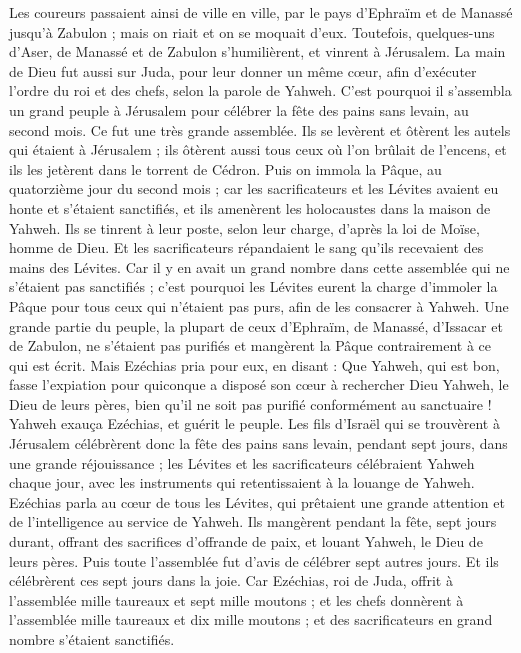 \begin{multicols}{2}
Les coureurs passaient ainsi de ville en ville, par le pays d'Ephraïm et de Manassé jusqu'à Zabulon ; mais on riait et on se moquait d’eux.
Toutefois, quelques-uns d'Aser, de Manassé et de Zabulon s'humilièrent, et vinrent à Jérusalem.
La main de Dieu fut aussi sur Juda, pour leur donner un même cœur, afin d'exécuter l’ordre du roi et des chefs, selon la parole de Yahweh.
C'est pourquoi il s'assembla un grand peuple à Jérusalem pour célébrer la fête des pains sans levain, au second mois. Ce fut une très grande assemblée.
Ils se levèrent et ôtèrent les autels qui étaient à Jérusalem ; ils ôtèrent aussi tous ceux où l'on brûlait de l'encens, et ils les jetèrent dans le torrent de Cédron.
Puis on immola la Pâque, au quatorzième jour du second mois ; car les sacrificateurs et les Lévites avaient eu honte et s'étaient sanctifiés, et ils amenèrent les holocaustes dans la maison de Yahweh.
Ils se tinrent à leur poste, selon leur charge, d'après la loi de Moïse, homme de Dieu. Et les sacrificateurs répandaient le sang qu'ils recevaient des mains des Lévites.
Car il y en avait un grand nombre dans cette assemblée qui ne s'étaient pas sanctifiés ; c’est pourquoi les Lévites eurent la charge d'immoler la Pâque pour tous ceux qui n'étaient pas purs, afin de les consacrer à Yahweh.
Une grande partie du peuple, la plupart de ceux d'Ephraïm, de Manassé, d'Issacar et de Zabulon, ne s'étaient pas purifiés et mangèrent la Pâque contrairement à ce qui est écrit. Mais Ezéchias pria pour eux, en disant : Que Yahweh, qui est bon, fasse l'expiation
pour quiconque a disposé son cœur à rechercher Dieu Yahweh, le Dieu de leurs pères, bien qu’il ne soit pas purifié conformément au sanctuaire !
Yahweh exauça Ezéchias, et guérit le peuple.
Les fils d’Israël qui se trouvèrent à Jérusalem célébrèrent donc la fête des pains sans levain, pendant sept jours, dans une grande réjouissance ; les Lévites et les sacrificateurs célébraient Yahweh chaque jour, avec les instruments qui retentissaient à la louange de Yahweh.
Ezéchias parla au cœur de tous les Lévites, qui prêtaient une grande attention et de l’intelligence au service de Yahweh. Ils mangèrent pendant la fête, sept jours durant, offrant des sacrifices d’offrande de paix, et louant Yahweh, le Dieu de leurs pères.
Puis toute l'assemblée fut d'avis de célébrer sept autres jours. Et ils célébrèrent ces sept jours dans la joie.
Car Ezéchias, roi de Juda, offrit à l'assemblée mille taureaux et sept mille moutons ; et les chefs donnèrent à l'assemblée mille taureaux et dix mille moutons ; et des sacrificateurs en grand nombre s'étaient sanctifiés.

\end{multicols}

